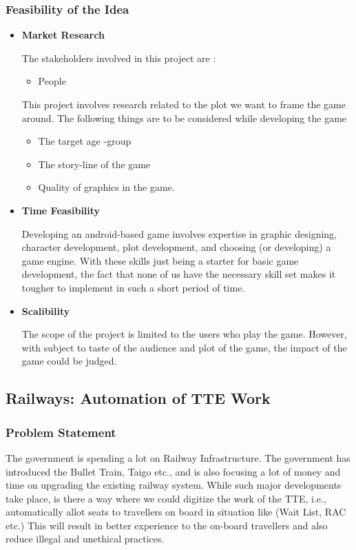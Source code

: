\documentclass{article}
\begin{document}
\subsubsection{Feasibility of the Idea}
\begin{itemize}
    \item \textbf{Market Research}
    \par The stakeholders involved in this project are :
    \begin{itemize}
        \item People
    \end{itemize}
    \par This project involves research related to the plot we want to frame the game around. The following things are to be considered while developing the game
        \begin{itemize}
            \item The target age -group
            \item The story-line of the game
            \item Quality of graphics in the game.
        \end{itemize}
    
    \item \textbf{Time Feasibility}
    \par Developing an android-based game involves expertise in graphic designing, character development, plot development,
and choosing (or developing) a game engine.  With these skills just being a starter for basic game development, the fact
that none of us have the necessary skill set makes it tougher to implement in such a short period of time.
\item \textbf{Scalibility}
\par The scope of the project is limited to the users who play the game. However, with subject to taste of the audience and plot of the game, the impact of the game could be judged.
\end{itemize}


\subsection{Railways: Automation of TTE Work}
\subsubsection{Problem Statement}
\par The government is spending a lot on Railway Infrastructure. The government has introduced the Bullet Train, Taigo etc., and is also focusing a lot of money and time on upgrading the existing railway system. While such major developments take place, is there a way where we could digitize the work of the TTE, i.e., automatically allot seats to travellers on board in situation like (Wait List, RAC etc.) This will result in better experience to the on-board travellers and also reduce illegal and unethical practices.
\end{document}
